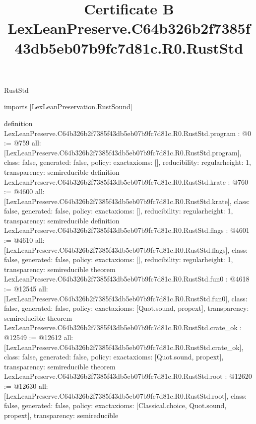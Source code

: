 \begin{lexlean}{RustStd}
\title{Certificate B LexLeanPreserve.C64b326b2f7385f43db5eb07b9fc7d81c.R0.RustStd}
\begin{coremodule}
imports [LexLeanPreservation.RustSound]

definition LexLeanPreserve.C64b326b2f7385f43db5eb07b9fc7d81c.R0.RustStd.program : @0 := @759 {
  all: [LexLeanPreserve.C64b326b2f7385f43db5eb07b9fc7d81c.R0.RustStd.program],
  class: false,
  generated: false,
  policy: exact{axioms: []},
  reducibility: regular{height: 1},
  transparency: semireducible
}
definition LexLeanPreserve.C64b326b2f7385f43db5eb07b9fc7d81c.R0.RustStd.krate : @760 := @4600 {
  all: [LexLeanPreserve.C64b326b2f7385f43db5eb07b9fc7d81c.R0.RustStd.krate],
  class: false,
  generated: false,
  policy: exact{axioms: []},
  reducibility: regular{height: 1},
  transparency: semireducible
}
definition LexLeanPreserve.C64b326b2f7385f43db5eb07b9fc7d81c.R0.RustStd.flags : @4601 := @4610 {
  all: [LexLeanPreserve.C64b326b2f7385f43db5eb07b9fc7d81c.R0.RustStd.flags],
  class: false,
  generated: false,
  policy: exact{axioms: []},
  reducibility: regular{height: 1},
  transparency: semireducible
}
theorem LexLeanPreserve.C64b326b2f7385f43db5eb07b9fc7d81c.R0.RustStd.fun0 : @4618 := @12545 {
  all: [LexLeanPreserve.C64b326b2f7385f43db5eb07b9fc7d81c.R0.RustStd.fun0],
  class: false,
  generated: false,
  policy: exact{axioms: [Quot.sound, propext]},
  transparency: semireducible
}
theorem LexLeanPreserve.C64b326b2f7385f43db5eb07b9fc7d81c.R0.RustStd.crate_ok : @12549 := @12612 {
  all: [LexLeanPreserve.C64b326b2f7385f43db5eb07b9fc7d81c.R0.RustStd.crate_ok],
  class: false,
  generated: false,
  policy: exact{axioms: [Quot.sound, propext]},
  transparency: semireducible
}
theorem LexLeanPreserve.C64b326b2f7385f43db5eb07b9fc7d81c.R0.RustStd.root : @12620 := @12630 {
  all: [LexLeanPreserve.C64b326b2f7385f43db5eb07b9fc7d81c.R0.RustStd.root],
  class: false,
  generated: false,
  policy: exact{axioms: [Classical.choice, Quot.sound, propext]},
  transparency: semireducible
}


\end{coremodule}
\end{lexlean}
